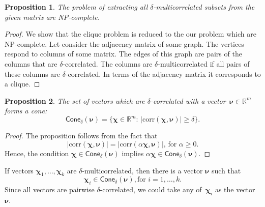 \documentclass[12pt,twoside]{article}
\newtheorem{proposition}{Proposition}
\theoremstyle{definition}
\newcommand{\bbR}{\mathbb{R}}
\newcommand{\bchi}{\boldsymbol{\chi}}
\newcommand{\bnu}{\boldsymbol{\nu}}
\begin{document}
\begin{proposition}
	The problem of extracting all $\delta$-multicorrelated subsets from the given matrix are NP-complete.
\end{proposition}
\begin{proof}
	We show that the clique problem is reduced to the our problem which are NP-complete. 
	Let consider the adjacency matrix of some graph. 
	The vertices respond to columns of some matrix. 
	The edges of this graph are pairs of the columns that are $\delta$-correlated.
	The columns are $\delta$-multicorrelated if all pairs of these columns are $\delta$-correlated.
	In terms of the adjacency matrix it corresponds to a clique.
\end{proof}
\begin{proposition}
	The set of vectors which are $\delta$-correlated with a vector~$\bnu \in \bbR^m$ forms a cone:
	\[
	\textsf{Cone}_{\delta} (\bnu) = \{ \bchi \in \bbR^m: \, |\text{corr}(\bchi, \bnu)| \geq \delta \}.
	\]
\end{proposition}
\begin{proof}
	The proposition follows from the fact that 
	\[
	|\text{corr}(\bchi, \bnu)| = | \text{corr}(\alpha \bchi, \bnu)|, \, \text{for } \alpha \geq 0.
	\]
	Hence, the condition $\bchi \in \textsf{Cone}_{\delta} (\bnu)$ implies $\alpha \bchi \in \textsf{Cone}_{\delta} (\bnu)$.
\end{proof}

	If vectors $\bchi_1, \dots, \bchi_k$ are $\delta$-multicorrelated, then there is a vector $\bnu$ such that 
	\[
		\bchi_i \in \textsf{Cone}_{\delta}(\bnu), \text{for } i = 1, \dots, k.
	\]
	Since all vectors are pairwise $\delta$-correlated, we could take any of~$\bchi_i$ as the vector~$\bnu$.
\end{document}
